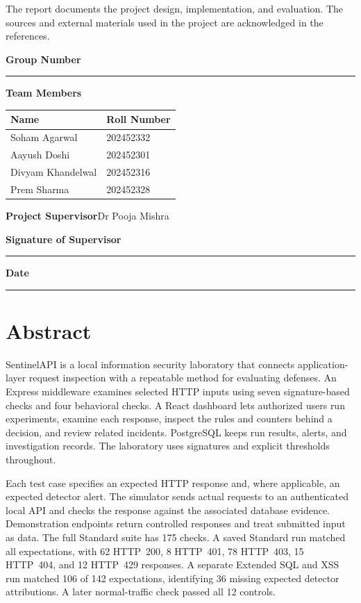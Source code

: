 \documentclass[11pt,a4paper,oneside]{report}
\newcommand{\Supervisor}{Dr Pooja Mishra}
\newcommand{\TeamRows}{Soham Agarwal & 202452332\\Aayush Doshi & 202452301\\Divyam Khandelwal & 202452316\\Prem Sharma & 202452328\\}
\begin{document}
The report documents the project design, implementation, and evaluation. The sources and external materials used in the project are acknowledged in the references.

\medskip
\textbf{Group Number}\quad\rule{2.35in}{.4pt}

\medskip
\textbf{Team Members}
\begin{center}
\renewcommand{\arraystretch}{1.3}%
\begin{tabular}{@{}p{.51\linewidth}p{.26\linewidth}@{}}
\toprule
\textbf{Name} & \textbf{Roll Number}\\
\midrule
\TeamRows
\bottomrule
\end{tabular}
\end{center}
\bigskip
\textbf{Project Supervisor}\quad \Supervisor

\vspace{.75in}
\textbf{Signature of Supervisor}\quad\rule{2.3in}{.4pt}

\textbf{Date}\quad\rule{2.3in}{.4pt}

\chapter*{Abstract}
SentinelAPI is a local information security laboratory that connects application-layer request inspection with a repeatable method for evaluating defenses. An Express middleware examines selected HTTP inputs using seven signature-based checks and four behavioral checks. A React dashboard lets authorized users run experiments, examine each response, inspect the rules and counters behind a decision, and review related incidents. PostgreSQL keeps run results, alerts, and investigation records. The laboratory uses signatures and explicit thresholds throughout.

Each test case specifies an expected HTTP response and, where applicable, an expected detector alert. The simulator sends actual requests to an authenticated local API and checks the response against the associated database evidence. Demonstration endpoints return controlled responses and treat submitted input as data. The full Standard suite has 175 checks. A saved Standard run matched all expectations, with 62 HTTP~200, 8 HTTP~401, 78 HTTP~403, 15 HTTP~404, and 12 HTTP~429 responses. A separate Extended SQL and XSS run matched 106 of 142 expectations, identifying 36 missing expected detector attributions. A later normal-traffic check passed all 12 controls.
\end{document}
